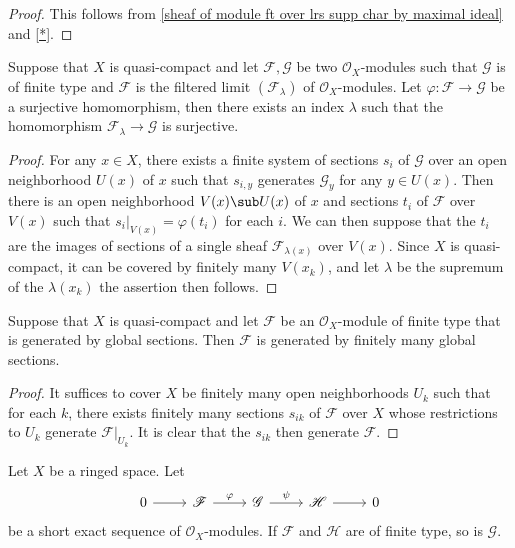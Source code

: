 \begin{proof}
This follows from \cref{sheaf of module ft over lrs supp char by maximal ideal} and \cref{*}.
\end{proof}
\begin{proposition}\label{sheaf of module ft over qc surjective homomorphism prop}
Suppose that $X$ is quasi-compact and let $\mathscr{F},\mathscr{G}$ be two $\mathscr{O}_X$-modules such that $\mathscr{G}$ is of finite type and $\mathscr{F}$ is the filtered limit $(\mathscr{F}_\lambda)$ of $\mathscr{O}_X$-modules. Let $\varphi:\mathscr{F}\to\mathscr{G}$ be a surjective homomorphism, then there exists an index $\lambda$ such that the homomorphism $\mathscr{F}_\lambda\to\mathscr{G}$ is surjective.
\end{proposition}
\begin{proof}
For any $x\in X$, there exists a finite system of sections $s_i$ of $\mathscr{G}$ over an open neighborhood $U(x)$ of $x$ such that $s_{i,y}$ generates $\mathscr{G}_y$ for any $y\in U(x)$. Then there is an open neighborhood $V(x)\sub U(x)$ of $x$ and sections $t_i$ of $\mathscr{F}$ over $V(x)$ such that $s_i|_{V(x)}=\varphi(t_i)$ for each $i$. We can then suppose that the $t_i$ are the images of sections of a single sheaf $\mathscr{F}_{\lambda(x)}$ over $V(x)$. Since $X$ is quasi-compact, it can be covered by finitely many $V(x_k)$, and let $\lambda$ be the supremum of the $\lambda(x_k)$ the assertion then follows.
\end{proof}
\begin{corollary}\label{sheaf of module ft over qc global generated then finite}
Suppose that $X$ is quasi-compact and let $\mathscr{F}$ be an $\mathscr{O}_X$-module of finite type that is generated by global sections. Then $\mathscr{F}$ is generated by finitely many global sections.
\end{corollary}
\begin{proof}
It suffices to cover $X$ be finitely many open neighborhoods $U_k$ such that for each $k$, there exists finitely many sections $s_{ik}$ of $\mathscr{F}$ over $X$ whose restrictions to $U_k$ generate $\mathscr{F}|_{U_k}$. It is clear that the $s_{ik}$ then generate $\mathscr{F}$.
\end{proof}
\begin{proposition}\label{sheaf of module ft exact sequence}
Let $X$ be a ringed space. Let 
\[\begin{tikzcd}
0\ar[r]&\mathscr{F}\ar[r,"\varphi"]&\mathscr{G}\ar[r,"\psi"]&\mathscr{H}\ar[r]&0
\end{tikzcd}\] 
be a short exact sequence of $\mathscr{O}_X$-modules. If $\mathscr{F}$ and $\mathscr{H}$ are of finite type, so is $\mathscr{G}$.
\end{proposition}
